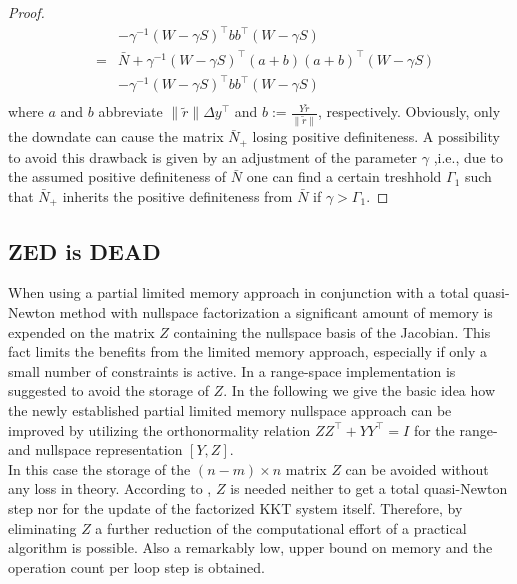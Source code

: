 \documentclass{svmult}
\begin{document}
\begin{proof}
\begin{eqnarray*}
			&& - \gamma^{-1}(W -\gamma S )^{\top}bb^{\top}(W -\gamma S ) \\
			&=&\bar{N}+\gamma^{-1}(W -\gamma S )^{\top}(a+b)(a+b)^{\top}(W -\gamma S )\\
			&& - \gamma^{-1}(W -\gamma S )^{\top}bb^{\top}(W -\gamma S )\\
	\end{eqnarray*}
	where $a$ and $b$ abbreviate $\| \tilde{r}\|\varDelta y^{\top}$ and $b:=\frac{Y\tilde{r}}{\| \tilde{r}\|}$, respectively.
	Obviously, only the downdate can cause the matrix $\bar{N}_+$ losing positive definiteness.
	A possibility to avoid this drawback  is given by an adjustment of the parameter $\gamma$ ,i.e., 
	due to the assumed positive definiteness of $\bar{N}$ one can find a certain treshhold $\Gamma_1$ such that $\bar{N}_+$  inherits the
	positive definiteness from  $\bar{N}$ if $\gamma>\Gamma_1$.
	
	
\end{proof}



 \clearpage
\subsection{ZED is DEAD}
\noindent When using a partial limited memory approach in conjunction with a total quasi-Newton method with nullspace factorization a significant amount of memory is expended on the matrix $Z$ containing the nullspace basis of the Jacobian. This fact limits the benefits from the limited memory approach, especially if only a small number of constraints is active. In \cite{tb:VOLKER} a range-space implementation is suggested to avoid the storage of $Z$. In the following we give the basic idea how the newly established partial limited memory nullspace approach can be improved by utilizing the orthonormality relation $ZZ^{\top}+YY^{\top}=I$ for the range- and nullspace representation $[Y,Z]$. \\
\noindent In this case the storage of the $(n-m)\times n$ matrix $Z$ can be avoided without any loss in theory.
According to \cite{tb:TORSTEN},  $Z$ is needed neither to get a total quasi-Newton step nor for the update of the factorized KKT system itself. Therefore, by eliminating $Z$ a further reduction of the computational effort of a practical algorithm is possible. Also a remarkably low, upper bound on memory and the operation count per loop step is obtained.
\end{document}
